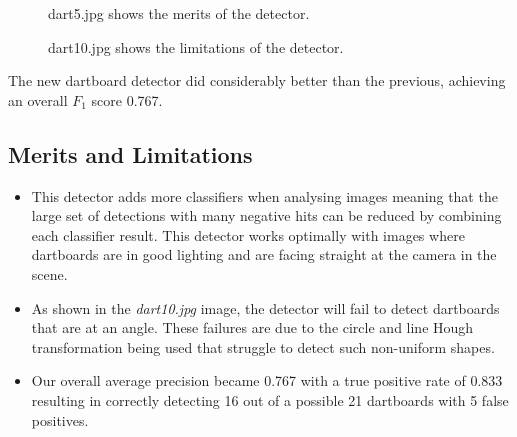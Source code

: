 \documentclass[a4paper]{article}
\begin{document}
\vspace{-2em}
\begin{figure}[H]
  \centering
  \hfill
   \hfill
   \hfill
   \hfill
   \caption{dart5.jpg shows the merits of the detector.}
\end{figure}
\vspace{-2.5em}

\begin{figure}[H]
  \centering
  \hfill
   \hfill
   \hfill
   \hfill
   \caption{dart10.jpg shows the limitations of the detector.}
\end{figure}

The new dartboard detector did considerably better than the previous, achieving
an overall \(F_{1}\) score 0.767.

\subsection*{Merits and Limitations}
\vspace{-0.7em}
\begin{itemize}
    \item This detector adds more classifiers when analysing images meaning
      that the large set of detections with many negative hits can be reduced
      by combining each classifier result. This detector works optimally with
      images where dartboards are in good lighting and are facing straight at
    the camera in the scene.
  \item As shown in the \textit{dart10.jpg} image, the detector will fail to
    detect dartboards that are at an angle. These failures are due to the
    circle and line Hough transformation being used that struggle to detect
    such non-uniform shapes.
    \item Our overall average precision became 0.767 with a true positive rate
      of 0.833 resulting in correctly detecting 16 out of a possible 21
      dartboards with 5 false positives.
\end{itemize}
\end{document}
